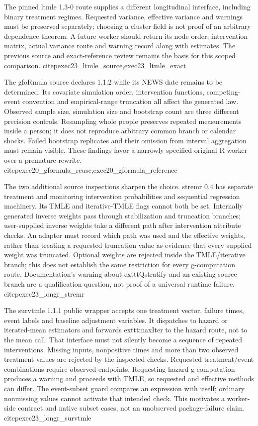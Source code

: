 The pinned ltmle 1.3-0 route supplies a different longitudinal interface,
including binary treatment regimes. Requested variance, effective variance
and warnings must be preserved separately; choosing a cluster field is not
proof of an arbitrary dependence theorem. A future worker should return its
node order, intervention matrix, actual variance route and warning record
along with estimates. The previous source and exact-reference review remains
the basis for this scoped comparison. citep{exec23_ltmle_source,exec23_ltmle_exact}

The gfoRmula source declares 1.1.2 while its NEWS date remains to be determined.
Its covariate simulation order, intervention functions, competing-event
convention and empirical-range truncation all affect the generated law.
Observed sample size, simulation size and bootstrap count are three different
precision controls. Resampling whole people preserves repeated measurements
inside a person; it does not reproduce arbitrary common branch or calendar
shocks. Failed bootstrap replicates and their omission from interval
aggregation must remain visible. These findings favor a narrowly specified
original R worker over a premature rewrite. citep{exec20_gformula_reuse,exec20_gformula_reference}

The two additional source inspections sharpen the choice. stremr 0.4 has
separate treatment and monitoring intervention probabilities and sequential
regression machinery. Its TMLE and iterative-TMLE flags cannot both be set.
Internally generated inverse weights pass through stabilization and truncation
branches; user-supplied inverse weights take a different path after intervention
attribute checks. An adapter must record which path was used and the effective
weights, rather than treating a requested truncation value as evidence that
every supplied weight was truncated. Optional weights are rejected inside
the TMLE/iterative branch; this does not establish the same restriction for
every g-computation route. Documentation's warning about 	exttt{Qstratify}
and an existing source branch are a qualification question, not proof of a
universal runtime failure. citep{exec23_longr_stremr}

The survtmle 1.1.1 public wrapper accepts one treatment vector, failure times,
event labels and baseline adjustment variables. It dispatches to hazard or
iterated-mean estimators and forwards 	exttt{maxIter} to the hazard route,
not to the mean call. That interface must not silently become a sequence of
repeated interventions. Missing inputs, nonpositive times and more than two
observed treatment values are rejected by the inspected checks. Requested
treatment/event combinations require observed endpoints. Requesting hazard
g-computation produces a warning and proceeds with TMLE, so requested and
effective methods can differ. The event-subset guard compares an expression
with itself; ordinary nonmissing values cannot activate that intended check.
This motivates a worker-side contract and native subset cases, not an
unobserved package-failure claim. citep{exec23_longr_survtmle}

